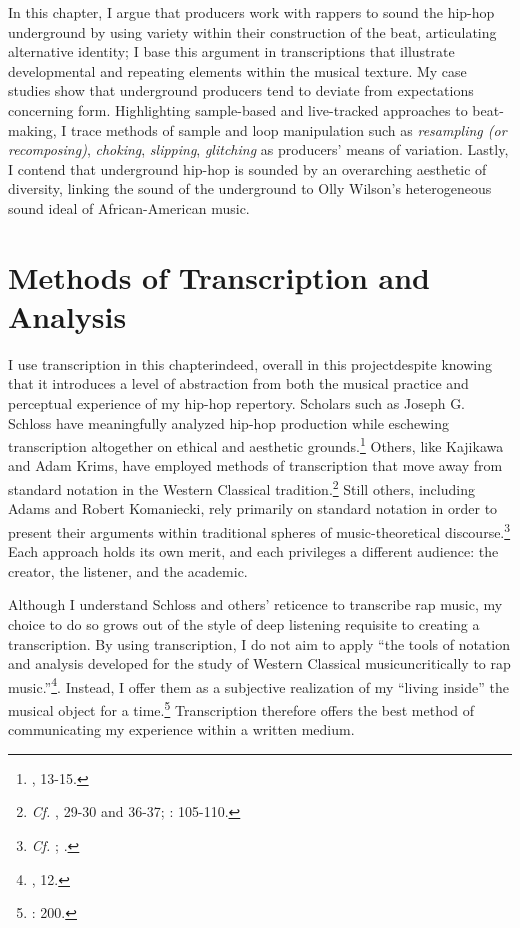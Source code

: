 In this chapter, I argue that producers work with rappers to sound the hip-hop underground by using variety within their construction of the beat, articulating alternative identity; I base this argument in transcriptions that illustrate developmental and repeating elements within the musical texture. My case studies show that underground producers tend to deviate from expectations concerning form. Highlighting sample-based and live-tracked approaches to beat-making, I trace methods of sample and loop manipulation such as \emph{resampling (or recomposing)}, \emph{choking}, \emph{slipping}, \emph{glitching} as producers' means of variation. Lastly, I contend that underground hip-hop is sounded by an overarching aesthetic of diversity, linking the sound of the underground to Olly Wilson's heterogeneous sound ideal of African-American music.

\section{Methods of Transcription and Analysis}
I use transcription in this chapter\textemdash indeed, overall in this project\textemdash despite knowing that it introduces a level of abstraction from both the musical practice and perceptual experience of my hip-hop repertory. Scholars such as Joseph G. Schloss have meaningfully analyzed hip-hop production while eschewing transcription altogether on ethical and aesthetic grounds.\footnote{\cite{josephgschlossMakingBeatsArt2004}, 13-15.} Others, like Kajikawa and Adam Krims, have employed methods of transcription that move away from standard notation in the Western Classical tradition.\footnote{\textit{Cf.} \cite{lorenkajikawaSoundingRaceRap2015}, 29-30 and 36-37; \cite{adamkrimsRapMusicPoetics2000}: 105-110.} Still others, including Adams and Robert Komaniecki, rely primarily on standard notation in order to present their arguments within traditional spheres of music-theoretical discourse.\footnote{\textit{Cf. }\cite{kyleadamsMetricalTechniquesFlow2009}; \cite{robertkomanieckiAnalyzingCollaborativeFlow2017}.} Each approach holds its own merit, and each privileges a different audience: the creator, the listener, and the academic.

Although I understand Schloss and others' reticence to transcribe rap music, my choice to do so grows out of the style of deep listening requisite to creating a transcription. By using transcription, I do not aim to apply ``the tools of notation and analysis developed for the study of Western Classical music\textellipsis uncritically to rap music.''\footnote{\cite{lorenkajikawaSoundingRaceRap2015}, 12.}. Instead, I offer them as a subjective realization of my ``living inside'' the musical object for a time.\footnote{\cite{peterwinklerWritingGhostNotes1997}: 200.} Transcription therefore offers the best method of communicating my experience within a written medium.

